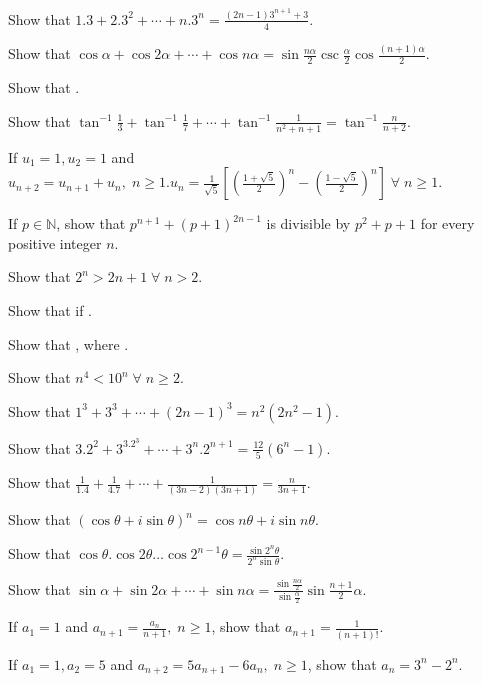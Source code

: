 \item Show that $1.3 + 2.3^2 + \cdots + n.3^n = \frac{(2n - 1)3^{n + 1} + 3}{4}$.
\item Show that $\cos\alpha + \cos2\alpha + \cdots + \cos n\alpha =
  \sin\frac{n\alpha}{2}\csc\frac{\alpha}{2}\cos\frac{(n + 1)\alpha}{2}$.
\item Show that .
\item Show that $\tan^{-1}\frac{1}{3} + \tan^{-1}\frac{1}{7} + \cdots + \tan^{-1}\frac{1}{n^2 + n + 1} = \tan^{-1}\frac{n}{n + 2}$.
\item If $u_1 = 1, u_2 = 1$ and $u_{n + 2} = u_{n + 1} + u_n,\;n\geq 1. u_n = \frac{1}{\sqrt{5}}\left[\left(\frac{1 +
    \sqrt{5}}{2}\right)^n - \left(\frac{1 - \sqrt{5}}{2}\right)^n\right]\;\forall\;n\geq 1$.
\item If $p\in\mathbb{N}$, show that $p^{n + 1} + (p + 1)^{2n - 1}$ is divisible by $p^2 + p + 1$ for every positive integer $n$.
\item Show that $2^n > 2n + 1\;\forall\;n > 2$.
\item Show that  if .
\item Show that , where .
\item Show that $n^4 < 10^n\;\forall\;n\geq 2$.
\item Show that $1^3 + 3^3 + \cdots + (2n - 1)^3 = n^2(2n^2 - 1)$.
\item Show that $3.2^2 + 3^3.2^3 + \cdots + 3^n.2^{n + 1} = \frac{12}{5}(6^n - 1)$.
\item Show that $\frac{1}{1.4} + \frac{1}{4.7} + \cdots + \frac{1}{(3n - 2)(3n + 1)} = \frac{n}{3n+ 1}$.
\item Show that $(\cos\theta + i\sin\theta)^n = \cos n\theta + i\sin n\theta$.
\item Show that $\cos\theta.\cos2\theta\ldots\cos2^{n - 1}\theta = \frac{\sin2^n\theta}{2^n\sin\theta}$.
\item Show that $\sin\alpha + \sin2\alpha + \cdots + \sin n\alpha = \frac{\sin \frac{n\alpha}{2}}{\sin\frac{\alpha}{2}}\sin\frac{n +
  1}{2}\alpha$.
\item If $a_1 = 1$ and $a_{n + 1} = \frac{a_n}{n + 1},\;n\geq 1$, show that $a_{n + 1} = \frac{1}{(n + 1)!}$.
\item If $a_1 = 1, a_2 = 5$ and $a_{n + 2} = 5a_{n + 1} - 6a_n,\;n\geq 1$, show that $a_n = 3^n - 2^n$.
